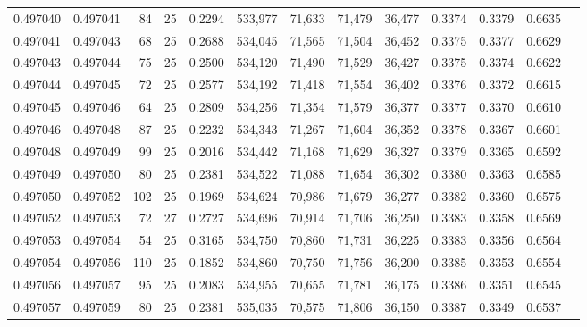 \begin{tabular}{rrrrrrrrrrrrr}
0.497040 & 0.497041 &    84 &  25 &                                     0.2294 & 533,977 &  71,633 &  71,479 &  36,477 & 0.3374 & 0.3379 & 0.6635 \\
0.497041 & 0.497043 &    68 &  25 &                                     0.2688 & 534,045 &  71,565 &  71,504 &  36,452 & 0.3375 & 0.3377 & 0.6629 \\
0.497043 & 0.497044 &    75 &  25 &                                     0.2500 & 534,120 &  71,490 &  71,529 &  36,427 & 0.3375 & 0.3374 & 0.6622 \\
0.497044 & 0.497045 &    72 &  25 &                                     0.2577 & 534,192 &  71,418 &  71,554 &  36,402 & 0.3376 & 0.3372 & 0.6615 \\
0.497045 & 0.497046 &    64 &  25 &                                     0.2809 & 534,256 &  71,354 &  71,579 &  36,377 & 0.3377 & 0.3370 & 0.6610 \\
0.497046 & 0.497048 &    87 &  25 &                                     0.2232 & 534,343 &  71,267 &  71,604 &  36,352 & 0.3378 & 0.3367 & 0.6601 \\
0.497048 & 0.497049 &    99 &  25 &                                     0.2016 & 534,442 &  71,168 &  71,629 &  36,327 & 0.3379 & 0.3365 & 0.6592 \\
0.497049 & 0.497050 &    80 &  25 &                                     0.2381 & 534,522 &  71,088 &  71,654 &  36,302 & 0.3380 & 0.3363 & 0.6585 \\
0.497050 & 0.497052 &   102 &  25 &                                     0.1969 & 534,624 &  70,986 &  71,679 &  36,277 & 0.3382 & 0.3360 & 0.6575 \\
0.497052 & 0.497053 &    72 &  27 &                                     0.2727 & 534,696 &  70,914 &  71,706 &  36,250 & 0.3383 & 0.3358 & 0.6569 \\
0.497053 & 0.497054 &    54 &  25 &                                     0.3165 & 534,750 &  70,860 &  71,731 &  36,225 & 0.3383 & 0.3356 & 0.6564 \\
0.497054 & 0.497056 &   110 &  25 &                                     0.1852 & 534,860 &  70,750 &  71,756 &  36,200 & 0.3385 & 0.3353 & 0.6554 \\
0.497056 & 0.497057 &    95 &  25 &                                     0.2083 & 534,955 &  70,655 &  71,781 &  36,175 & 0.3386 & 0.3351 & 0.6545 \\
0.497057 & 0.497059 &    80 &  25 &                                     0.2381 & 535,035 &  70,575 &  71,806 &  36,150 & 0.3387 & 0.3349 & 0.6537 \\

\end{tabular}
